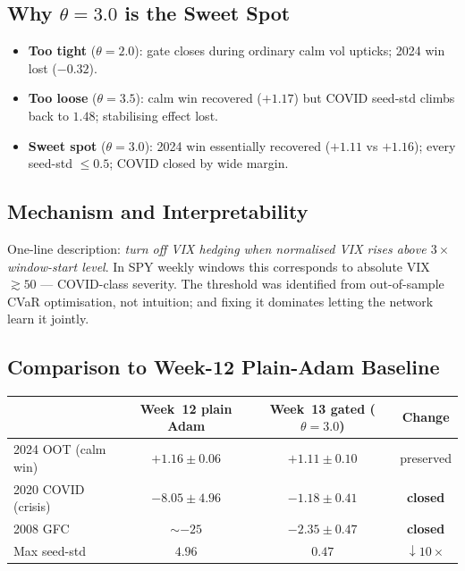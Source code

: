 \documentclass[11pt, a4paper]{article}
\begin{document}
\subsection{Why $\theta=3.0$ is the Sweet Spot}

\begin{itemize}
\item \textbf{Too tight} ($\theta=2.0$): gate closes during ordinary calm vol upticks;
      2024 win lost ($-0.32$).
\item \textbf{Too loose} ($\theta=3.5$): calm win recovered ($+1.17$) but COVID seed-std
      climbs back to $1.48$; stabilising effect lost.
\item \textbf{Sweet spot} ($\theta=3.0$): 2024 win essentially recovered ($+1.11$ vs $+1.16$);
      every seed-std $\le 0.5$; COVID closed by wide margin.
\end{itemize}

\subsection{Mechanism and Interpretability}

One-line description: \emph{turn off VIX hedging when normalised VIX rises above
$3\times$ window-start level}. In SPY weekly windows this corresponds to absolute
VIX $\gtrsim 50$ --- COVID-class severity. The threshold was identified from
out-of-sample CVaR optimisation, not intuition; and fixing it dominates letting
the network learn it jointly.

\subsection{Comparison to Week-12 Plain-Adam Baseline}

\begin{center}
\footnotesize
\begin{tabular}{lccc}
\toprule
                    & Week~12 plain Adam & Week~13 gated ($\theta=3.0$) & Change \\
\midrule
2024 OOT (calm win)  & $+1.16 \pm 0.06$ & $+1.11 \pm 0.10$ & preserved \\
2020 COVID (crisis)  & $-8.05 \pm 4.96$ & $-1.18 \pm 0.41$ & \textbf{closed} \\
2008 GFC             & $\sim{-25}$      & $-2.35 \pm 0.47$ & \textbf{closed} \\
Max seed-std         & $4.96$           & $0.47$           & $\downarrow 10\times$ \\
\bottomrule
\end{tabular}
\end{center}
\end{document}
